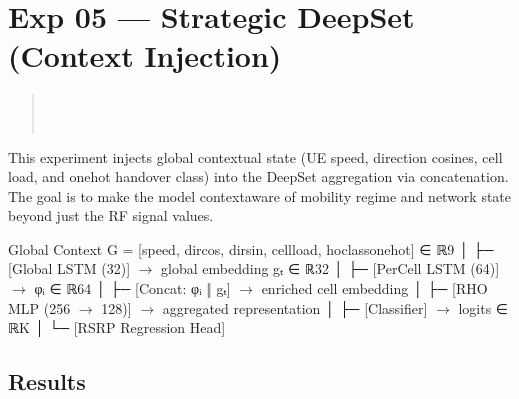 \documentclass[letterpaper,10pt,english]{sphinxmanual}
\begin{document}
\section{Exp 05 — Strategic DeepSet (Context Injection)}
\label{\detokenize{architecture:exp-05-strategic-deepset-context-injection}}\begin{quote}

\sphinxAtStartPar
{} \\
 \\
 
\end{quote}

\sphinxAtStartPar
This experiment injects global contextual state (UE speed, direction cosines, cell load, and one\sphinxhyphen{}hot handover class) into the DeepSet aggregation via concatenation. The goal is to make the model context\sphinxhyphen{}aware of mobility regime and network state beyond just the RF signal values.

\sphinxAtStartPar
{}

\begin{sphinxVerbatim}[commandchars=\\\{\}]
Global Context G = [speed, dir\PYGZus{}cos, dir\PYGZus{}sin, cell\PYGZus{}load, ho\PYGZus{}class\PYGZus{}onehot]  ∈ ℝ\PYGZca{}9
    │
    ├─ [Global LSTM (32)] \(\rightarrow\) global embedding gₜ ∈ ℝ\PYGZca{}32
    │
    ├─ [Per\PYGZhy{}Cell LSTM (64)] \(\rightarrow\) φᵢ ∈ ℝ\PYGZca{}64
    │
    ├─ [Concat: φᵢ ‖ gₜ] \(\rightarrow\) enriched cell embedding
    │
    ├─ [RHO MLP (256 \(\rightarrow\) 128)] \(\rightarrow\) aggregated representation
    │
    ├─ [Classifier] \(\rightarrow\) logits ∈ ℝ\PYGZca{}K
    │
    └─ [RSRP Regression Head]
\end{sphinxVerbatim}


\subsection{Results}
\label{\detokenize{architecture:id6}}
\end{document}
